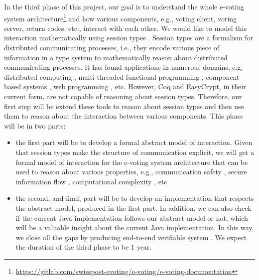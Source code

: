 \documentclass[a4paper]{article}
\begin{document}
In the third phase of this project, our goal is to understand the whole 
e-voting system architecture\footnote{\url{https://gitlab.com/swisspost-evoting/e-voting/e-voting-documentation}} 
and how various components, e.g., voting client, voting server, return codes, etc., 
interact with each other. We would like to model this 
interaction mathematically using session types \cite{10.1007/978-3-642-38592-6_5}. 
Session types are a formalism for distributed communicating processes, i.e., 
they encode various piece of information in a type system to mathematically reason about 
distributed communicating processes. It has found applications in numerous domains, e.g, 
distributed computing \cite{10.1145/3290341}, 
multi-threaded functional programming \cite{vasconcelos2006type},
component-based systems \cite{vallecillo2003typing}, web programming \cite{10.1145/3446804.3446854}, etc. 
However, Coq and EasyCrypt, in their current form, are not capable of reasoning about session types. 
Therefore, our first step will be extend these tools to reason about 
session types \cite{ZFHNY2020} and then use them to reason about the interaction between 
various components. This phase will be in two parts:
\begin{itemize}
  \item the first part will be to develop a formal abstract model of interaction.  Given that session types 
  make the structure of communication explicit, we will get a formal model of interaction for 
  the e-voting system architecture that can be used to reason about 
  various properties, e.g., communication safety \cite{TONINHO201761},
  secure information flow \cite{10.1007/978-3-642-15375-4_17}, computational complexity \cite{10.1145/3209108.3209122},
  etc. 

  \item the second, and final, part will be to develop an implementation that
  respects the abstract model, produced in the first part. In addition, 
  we can also check if the current Java implementation follows our 
  abstract model or not, which will be a valuable insight about the current Java implementation.
  In this way, we close all the gaps by producing end-to-end verifiable system \cite{4271648, ZFHNY2020, basin}.
  We expect the duration of the third phase to be 1 year.

\end{itemize}
\end{document}
